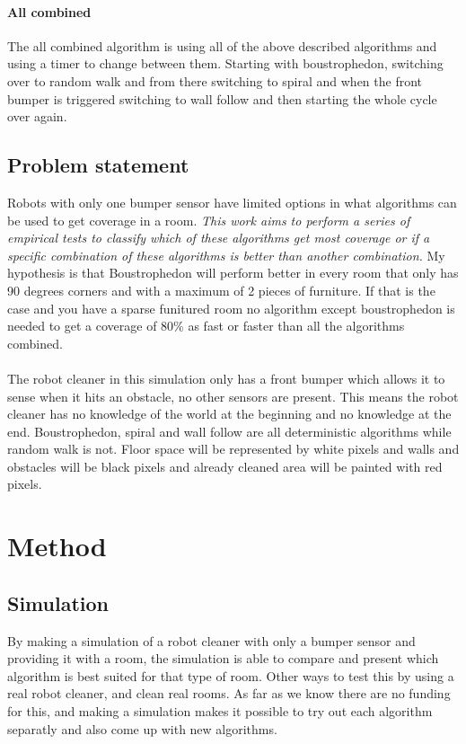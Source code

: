 \documentclass[bachelor]{kththesis}
\begin{document}
\subsubsection{All combined}
The all combined algorithm is using all of the above described algorithms and using a timer to change between them. Starting with boustrophedon, switching over to random walk and from there switching to spiral and when the front bumper is triggered switching to wall follow and then starting the whole cycle over again.

\section{Problem statement}

Robots with only one bumper sensor have limited options in what algorithms can be used to get 
coverage in a room. \emph{This work aims to perform a series of empirical tests to classify which of these 
algorithms get most coverage or if a specific combination of these algorithms is better than another 
combination.}
My hypothesis is that Boustrophedon will perform better in every room that only has 90 degrees 
corners and with a maximum of 2 pieces of furniture. If that is the case and you have a sparse funitured room 
no algorithm except boustrophedon is needed to get a coverage of 80\% as fast or faster than all the algorithms combined.
\\\\
The robot cleaner in this simulation only has a front bumper which allows it to sense when it hits 
an obstacle, no other sensors are present. This means the robot cleaner has no knowledge of the 
world at the beginning and no knowledge at the end.
Boustrophedon, spiral and wall follow are all deterministic algorithms while random walk is not.
Floor space will be represented by white pixels and walls and obstacles will be black pixels and 
already cleaned area will be painted with red pixels.

\chapter{Method}
\section{Simulation}
By making a simulation of a robot cleaner with only a bumper sensor and  providing it with a room, the simulation is able to compare and present which algorithm is best suited for that type of room. Other ways to test this by using a real robot cleaner, and clean real rooms. As far as we know there are no funding for this, and making a simulation makes it possible to try out each algorithm separatly and also come up with new algorithms.
\end{document}

